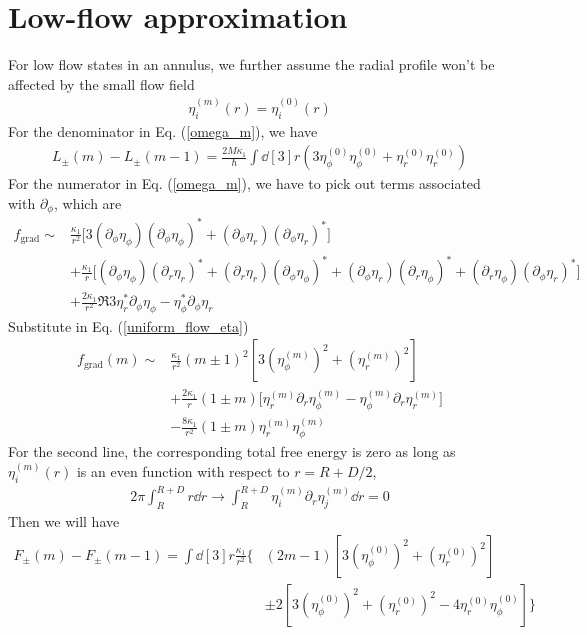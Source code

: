 \documentclass[aps,prl,preprint]{revtex4-2}
\begin{document}
\section{Low-flow approximation}
For low flow states in an annulus, we further assume the radial profile won't be affected by the small flow field
\begin{align}
    \eta^{(m)}_i(r) = \eta^{(0)}_i(r)
\end{align}
For the denominator in Eq. (\ref{omega_m}), we have
\begin{align}
    L_\pm(m) - L_\pm(m-1) = \frac{2M\kappa_1}{\hbar}\int\dd[3]r\left(3\eta_\phi^{(0)}\eta_\phi^{(0)}+\eta_r^{(0)}\eta_r^{(0)}\right)
\end{align}
For the numerator in Eq. (\ref{omega_m}), we have to pick out terms associated with $\partial_\phi$, which are
\begin{align}
    f_\text{grad}\sim&\frac{\kappa_1}{r^2}\bigg[3(\partial_\phi\eta_\phi)(\partial_\phi\eta_\phi)^* 
    + (\partial_\phi\eta_r)(\partial_\phi\eta_r)^*\bigg]\nonumber\\
    &+\frac{\kappa_1}{r}\bigg[(\partial_\phi\eta_\phi)(\partial_r\eta_r)^*
    + (\partial_r\eta_r)(\partial_\phi\eta_\phi)^* + (\partial_\phi\eta_r)(\partial_r\eta_\phi)^*
    + (\partial_r\eta_\phi)(\partial_\phi\eta_r)^*\bigg]\nonumber\\
    &+\frac{2\kappa_1}{r^2}\Re{3\eta_r^*\partial_\phi\eta_\phi 
    - \eta_\phi^*\partial_\phi\eta_r}
\end{align}
Substitute in Eq. (\ref{uniform_flow_eta})
\begin{align}
    f_\text{grad}(m)\sim&\frac{\kappa_1}{r^2}(m\pm 1)^2\left[3\left(\eta^{(m)}_\phi\right)^2 + \left(\eta^{(m)}_r\right)^2\right]\nonumber\\
    &+\frac{2\kappa_1}{r}(1\pm m)\bigg[\eta_r^{(m)}\partial_r\eta_\phi^{(m)} - \eta_\phi^{(m)}\partial_r\eta_r^{(m)}\bigg]\nonumber\\
    &-\frac{8\kappa_1}{r^2}(1\pm m)\eta^{(m)}_r\eta^{(m)}_\phi
\end{align}
For the second line, the corresponding total free energy is zero as long as $\eta_i^{(m)}(r)$ is an even function with respect to $r=R+D/2$,
\begin{align}
    2\pi\int_R^{R+D} r\dd r\rightarrow\int_R^{R+D}\eta^{(m)}_i\partial_r\eta^{(m)}_j\dd r = 0
\end{align}
Then we will have
\begin{align}
    F_\pm(m) - F_\pm(m-1) = \int\dd[3]r\frac{\kappa_1}{r^2}\Bigg\{&(2m-1)\left[3\left(\eta^{(0)}_\phi\right)^2 + \left(\eta^{(0)}_r\right)^2\right]\nonumber\\
    &\pm 2\left[3\left(\eta^{(0)}_\phi\right)^2 + \left(\eta^{(0)}_r\right)^2-4\eta^{(0)}_r\eta^{(0)}_\phi\right]\Bigg\}
\end{align}
\end{document}

